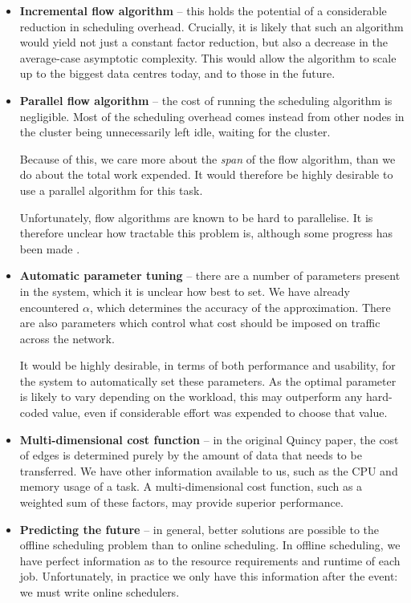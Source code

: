 \begin{itemize}
  \item \textbf{Incremental flow algorithm} -- this holds the potential of a considerable reduction in scheduling overhead. Crucially, it is likely that such an algorithm would yield not just a constant factor reduction, but also a decrease in the average-case asymptotic complexity. This would allow the algorithm to scale up to the biggest data centres today, and to those in the future.
  \item \textbf{Parallel flow algorithm} -- the cost of running the scheduling algorithm is negligible. Most of the scheduling overhead comes instead from other nodes in the cluster being unnecessarily left idle, waiting for the cluster.
    
    Because of this, we care more about the \emph{span} of the flow algorithm, than we do about the total work expended. It would therefore be highly desirable to use a parallel algorithm for this task.
    
    Unfortunately, flow algorithms are known to be hard to parallelise. It is therefore unclear how tractable this problem is, although some progress has been made \cite{Staples:1995}.
  \item \textbf{Automatic parameter tuning} -- there are a number of parameters present in the system, which it is unclear how best to set. We have already encountered $\alpha$, which determines the accuracy of the approximation. There are also parameters which control what cost should be imposed on traffic across the network.

        It would be highly desirable, in terms of both performance and usability, for the system to automatically set these parameters. As the optimal parameter is likely to vary depending on the workload, this may outperform any hard-coded value, even if considerable effort was expended to choose that value.
  \item \textbf{Multi-dimensional cost function} -- in the original Quincy paper, the cost of edges is determined purely by the amount of data that needs to be transferred. We have other information available to us, such as the CPU and memory usage of a task. A multi-dimensional cost function, such as a weighted sum of these factors, may provide superior performance.
  \item \textbf{Predicting the future} -- in general, better solutions are possible to the offline scheduling problem than to online scheduling. In offline scheduling, we have perfect information as to the resource requirements and runtime of each job. Unfortunately, in practice we only have this information after the event: we must write online schedulers.


\end{itemize}
